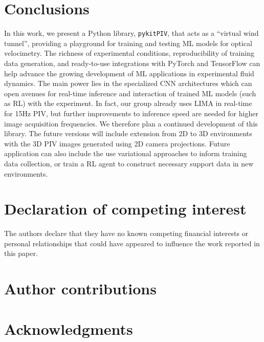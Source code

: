 \documentclass[a4paper,fleqn]{cas-dc}
\begin{document}
\section{Conclusions}

In this work, we present a Python library, \texttt{pykitPIV}, that acts as a ``virtual wind tunnel'', providing a playground for training and testing ML models for optical velocimetry. The richness of experimental conditions, reproducibility of training data generation, and ready-to-use integrations with PyTorch and TensorFlow can help advance the growing development of ML applications in experimental fluid dynamics. The main power lies in the specialized CNN architectures which can open avenues for real-time inference and interaction of trained ML models (such as RL) with the experiment. In fact, our group already uses LIMA in real-time for 15Hz PIV, but further improvements to inference speed are needed for higher image acquisition frequencies.
We therefore plan a continued development of this library. The future versions will include extension from 2D to 3D environments with the 3D PIV images generated using 2D camera projections. Future application can also include the use variational approaches to inform training data collection, or train a RL agent to construct necessary support data in new environments.

\section*{Declaration of competing interest}

The authors declare that they have no known competing financial interests or personal relationships that could have appeared to influence the work reported in this paper.

\section*{Author contributions}



\section*{Acknowledgments}





\end{document}
